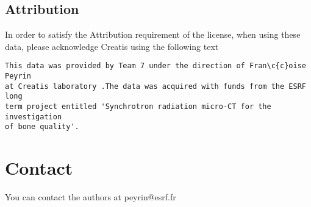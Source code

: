 \documentclass{InsightArticle}
\begin{document}
\subsection{Attribution}

In order to satisfy the Attribution requirement of the license, when using
these data, please acknowledge Creatis using the following text

\begin{verbatim}
This data was provided by Team 7 under the direction of Fran\c{c}oise Peyrin 
at Creatis laboratory .The data was acquired with funds from the ESRF long
term project entitled 'Synchrotron radiation micro-CT for the investigation
of bone quality'.
\end{verbatim}

\section{Contact}

You can contact the authors at peyrin@esrf.fr


%
%



\end{document}
